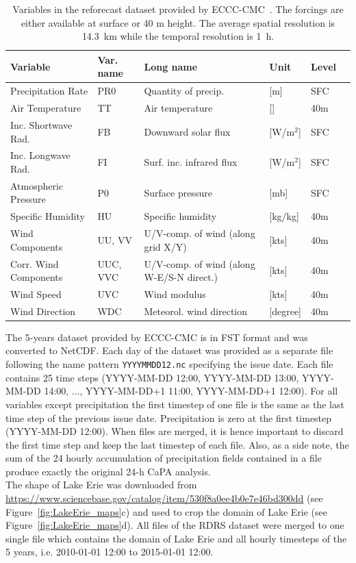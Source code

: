 \documentclass{article}
\begin{document}
	\begin{table}[h!]
		\caption{Variables in the reforecast dataset provided by ECCC-CMC~\citep{gasset2017c,gasset2018a}. The forcings are either available at surface or 40 m height. The average spatial resolution is 14.3~km while the temporal resolution is 1~h. }
		\label{tab:RDRS_variables}
		\centering
		{\small \begin{tabular}{p{8pc} p{3pc} p{8pc} p{3pc} p{3pc} p{3pc}}
				\hline
				Variable & Var. name & Long name & Unit & Level \\ \hline
				Precipitation Rate  & PR0 & Quantity of precip. & [m] & SFC \\
				Air Temperature     & TT & Air temperature & [\textcelsius] & 40m \\
				Inc. Shortwave Rad. & FB & Downward solar flux & [W/m$^2$] & SFC \\
				Inc. Longwave Rad.  & FI & Surf. inc. infrared flux & [W/m$^2$] & SFC \\
				Atmospheric Pressure& P0 & Surface pressure & [mb] & SFC \\
				Specific Humidity   & HU & Specific humidity & [kg/kg] & 40m \\
				Wind Components     & UU, VV & U/V-comp. of wind (along grid X/Y) & [kts] & 40m \\
				Corr. Wind Components & UUC, VVC & U/V-comp. of wind (along W-E/S-N direct.) & [kts] & 40m \\
				Wind Speed & UVC & Wind modulus & [kts] & 40m \\
				Wind Direction & WDC & Meteorol. wind direction & [degree] & 40m \\ \hline
		\end{tabular}}
	\end{table}
	
	The 5-years dataset provided by ECCC-CMC is in FST format and was converted to NetCDF. Each day of the dataset was provided as a separate file following the name pattern \texttt{YYYYMMDD12.nc} specifying the issue date. Each file contains 25 time steps (YYYY-MM-DD 12:00, YYYY-MM-DD 13:00, YYYY-MM-DD 14:00, ..., YYYY-MM-DD+1 11:00, YYYY-MM-DD+1 12:00). For all variables except precipitation the first timestep of one file is the same as the last time step of the previous issue date. Precipitation is zero at the first timestep (YYYY-MM-DD 12:00). When files are merged, it is hence important to discard the first time step and keep the last timestep of each file. Also, as a side note, the sum of the 24 hourly accumulation of precipitation fields contained in a file produce exactly the original 24-h CaPA analysis.\\[4pt]	
	The shape of Lake Erie was downloaded from \url{https://www.sciencebase.gov/catalog/item/530f8a0ee4b0e7e46bd300dd} (see Figure~\ref{fig:LakeErie_maps}c) and used to crop the domain of Lake Erie (see Figure~\ref{fig:LakeErie_maps}d). All files of the RDRS dataset were merged to one single file which contains the domain of Lake Erie and all hourly timesteps of the 5 years, i.e. 2010-01-01 12:00 to 2015-01-01 12:00.
	
\end{document}
